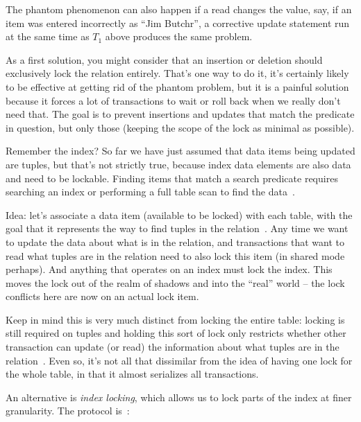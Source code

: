 The phantom phenomenon can also happen if a read changes the value, say, if an item was entered incorrectly as ``Jim Butchr'', a corrective update statement run at the same time as $T_{1}$ above produces the same problem.

As a first solution, you might consider that an insertion or deletion should exclusively lock the relation entirely. That's one way to do it, it's certainly likely to be effective at getting rid of the phantom problem, but it is a painful solution because it forces a lot of transactions to wait or roll back when we really don't need that. The goal is to prevent insertions and updates that match the predicate in question, but only those (keeping the scope of the lock as minimal as possible).

Remember the index? So far we have just assumed that data items being updated are tuples, but that's not strictly true, because index data elements are also data and need to be lockable. Finding items that match a search predicate requires searching an index or performing a full table scan to find the data~\cite{dsc}. 

Idea: let's associate a data item (available to be locked) with each table, with the goal that it represents the way to find tuples in the relation~\cite{dsc}. Any time we want to update the data about what is in the relation, and transactions that want to read what tuples are in the relation need to also lock this item (in shared mode perhaps). And anything that operates on an index must lock the index. This moves the lock out of the realm of shadows and into the ``real'' world -- the lock conflicts here are now on an actual lock item.

Keep in mind this is very much distinct from locking the entire table: locking is still required on tuples and holding this sort of lock only restricts whether other transaction can update (or read) the information about what tuples are in the relation~\cite{dsc}. Even so, it's not all that dissimilar from the idea of having one lock for the whole table, in that it almost serializes all transactions.

An alternative is \textit{index locking}, which allows us to lock parts of the index at finer granularity. The protocol is~\cite{dsc}:

